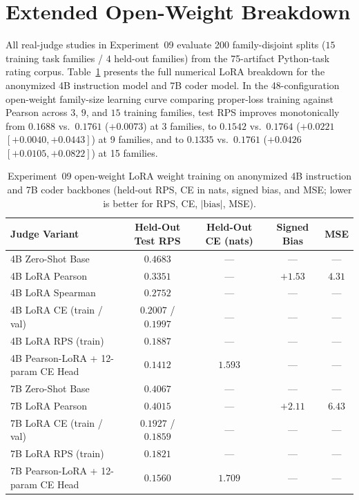 \section{Extended Open-Weight Breakdown}
\label{sec:supp-open}

All real-judge studies in Experiment~09 evaluate 200 family-disjoint splits ($15$ training task families / $4$ held-out families) from the 75-artifact Python-task rating corpus.
Table~\ref{tab:supp-lora} presents the full numerical LoRA breakdown for the anonymized 4B instruction model and 7B coder model.
In the 48-configuration open-weight family-size learning curve comparing proper-loss training against Pearson across $3$, $9$, and $15$ training families, test RPS improves monotonically from $0.1688$ vs.\ $0.1761$ ($+0.0073$) at 3 families, to $0.1542$ vs.\ $0.1764$ ($+0.0221$ $[+0.0040, +0.0443]$) at 9 families, and to $0.1335$ vs.\ $0.1761$ ($+0.0426$ $[+0.0105, +0.0822]$) at 15 families.

\begin{table}[t]
\centering
\caption{Experiment~09 open-weight LoRA weight training on anonymized 4B instruction and 7B coder backbones (held-out RPS, CE in nats, signed bias, and MSE; lower is better for RPS, CE, $|\mathrm{bias}|$, MSE).}
\label{tab:supp-lora}
\small
\begin{tabular}{@{}lcccc@{}}
\hline
Judge Variant & Held-Out Test RPS & Held-Out CE (nats) & Signed Bias & MSE \\
\hline
4B Zero-Shot Base & $0.4683$ & --- & --- & --- \\
4B LoRA Pearson & $0.3351$ & --- & $+1.53$ & $4.31$ \\
4B LoRA Spearman & $0.2752$ & --- & --- & --- \\
4B LoRA CE (train / val) & $0.2007$ / $0.1997$ & --- & --- & --- \\
4B LoRA RPS (train) & $0.1887$ & --- & --- & --- \\
4B Pearson-LoRA + 12-param CE Head & $0.1412$ & $1.593$ & --- & --- \\
\hline
7B Zero-Shot Base & $0.4067$ & --- & --- & --- \\
7B LoRA Pearson & $0.4015$ & --- & $+2.11$ & $6.43$ \\
7B LoRA CE (train / val) & $0.1927$ / $0.1859$ & --- & --- & --- \\
7B LoRA RPS (train) & $0.1821$ & --- & --- & --- \\
7B Pearson-LoRA + 12-param CE Head & $0.1560$ & $1.709$ & --- & --- \\
\hline
\end{tabular}
\end{table}

